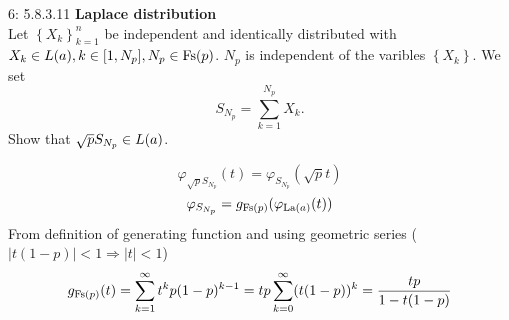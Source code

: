 \documentclass[a4paper,twoside=false,abstract=false,numbers=noenddot,
titlepage=false,headings=small,parskip=half,version=last]{scrartcl}
\begin{document}

\begin{exercise}{6: 5.8.3.11} \textbf{Laplace distribution} \\
    Let $\left\{{X_k}\right\}_{k=1}^n$ be independent and identically
    distributed with
    ${X_k \in\text{$L$}(a),}\, {k\in[1,N_p],}\, {N_p\in \text{Fs}(p)}$.
    $N_p$ is independent of the varibles $\left\{X_k\right\}$. We set
    \begin{equation}
        S_{N_p} = \sum\limits_{k=1}^{N_p}X_k.
    \end{equation}
    Show that $\sqrt{p}S_{N_p}\in\text{$L$}(a)$.
\end{exercise}
\begin{solution}
    \begin{equation}
        \varphi_{\sqrt{p}S_{N_p}}(t) = \varphi_{S_{N_p}}(\sqrt{p}t)
    \end{equation}
    \begin{equation}
        \varphi_{S_{N_p}} = g_{\text{Fs}(p)}(\varphi_{\text{La}(a)}(t))
    \end{equation}
    From definition of generating function and using geometric series
    ($|t(1-p)|<1\Rightarrow |t|<1$)
    \begin{equation}
        g_{\text{Fs}(p)}(t) = \sum\limits_{k=1}^\infty t^kp(1-p)^{k-1} =
        tp\sum\limits_{k=0}^\infty (t(1-p))^k = \frac{tp}{1-t(1-p)}
    \end{equation}

\end{solution}
\pagebreak

\end{document}
